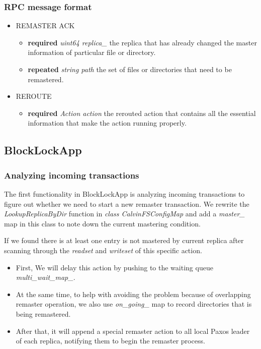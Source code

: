 \subsubsection{RPC message format}
\begin{itemize}
\item REMASTER ACK
\begin{itemize}
\item \textbf{required} \emph{uint64 replica\_} the replica that has already changed the master information of particular file or directory.
\item \textbf{repeated} \emph{string path} the set of files or directories that need to be remastered. 
\end{itemize}
\item REROUTE
\begin{itemize}
\item \textbf{required} \emph{Action action} the rerouted action that contains all the essential information that make the action running properly. 
\end{itemize}
\end{itemize}

\subsection{BlockLockApp}
\subsubsection{Analyzing incoming transactions}
The first functionality in BlockLockApp is analyzing incoming transactions to figure out whether we need to start a new remaster transaction. We rewrite the \emph{LookupReplicaByDir} function in \emph{class CalvinFSConfigMap} and add a \emph{master\_} map in this class to note down the current mastering condition. 

If we found there is at least one entry is not mastered by current replica after scanning through the \emph{readset} and \emph{writeset} of this specific action. 

\begin{itemize}
\item First, We will delay this action by pushing to the waiting queue \emph{multi\_wait\_map\_}. 

\item At the same time, to help with avoiding the problem because of overlapping remaster operation, we also use \emph{on\_going\_} map to record directories that is being remastered. 

\item After that, it will append a special remaster action to all local Paxos leader of each replica, notifying them to begin the remaster process. 
\end{itemize}

